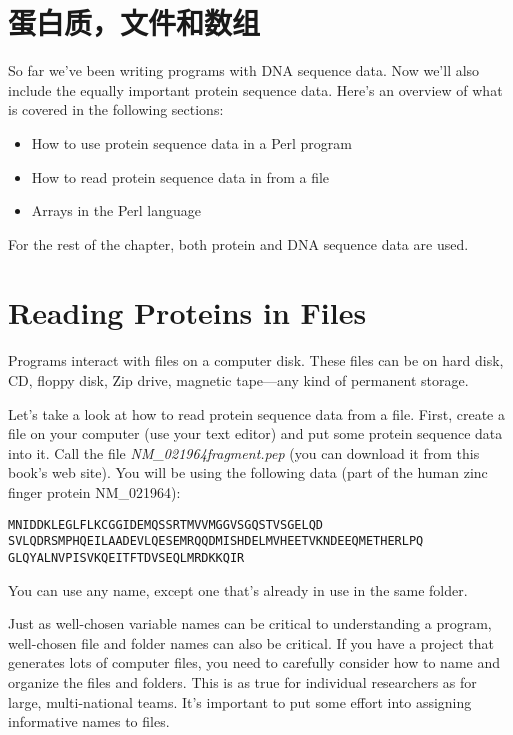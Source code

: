 \section{蛋白质，文件和数组}
So far we've been writing programs with DNA sequence data. Now we'll also include the equally important protein sequence data. Here's an overview of what is covered in the following sections:

\begin{itemize}
  \item How to use protein sequence data in a Perl program
  \item How to read protein sequence data in from a file
  \item Arrays in the Perl language
\end{itemize}

For the rest of the chapter, both protein and DNA sequence data are used. 

\section{Reading Proteins in Files}
Programs interact with files on a computer disk. These files can be on hard disk, CD, floppy disk, Zip drive, magnetic tape—any kind of permanent storage.

Let's take a look at how to read protein sequence data from a file.  First, create a file on your computer (use your text editor) and put some protein sequence data into it. Call the file \textit{NM\_021964fragment.pep} (you can download it from this book's web site).  You will be using the following data (part of the human zinc finger protein NM\_021964):

\begin{verbatim}
MNIDDKLEGLFLKCGGIDEMQSSRTMVVMGGVSGQSTVSGELQD
SVLQDRSMPHQEILAADEVLQESEMRQQDMISHDELMVHEETVKNDEEQMETHERLPQ
GLQYALNVPISVKQEITFTDVSEQLMRDKKQIR
\end{verbatim}

You can use any name, except one that's already in use in the same folder.

Just as well-chosen variable names can be critical to understanding a program, well-chosen file and folder names can also be critical. If you have a project that generates lots of computer files, you need to carefully consider how to name and organize the files and folders. This is as true for individual researchers as for large, multi-national teams. It's important to put some effort into assigning informative names to files.


